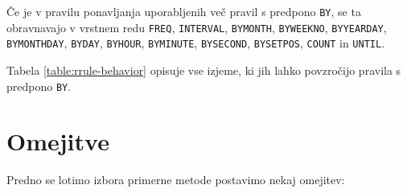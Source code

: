 \begin{table}
\footnotesize
{}
\caption{Razpredelnica izjem pri uporabi pravil za ponavljanje dogodkov. \textbf{Izjema 1:} omeji če je prisotno pravilo \texttt{BYMONTHDAY}, drugače razširi. \textbf{Izjema 2:} omeji za pravili \texttt{BYYEARDAY} in \texttt{BYMONTHDAY}, drugače razširi. }
\label{table:rrule-behavior}
\end{table}

Če je v pravilu ponavljanja uporabljenih več pravil s predpono \texttt{BY}, se ta obravnavajo v vrstnem redu \texttt{FREQ}, \texttt{INTERVAL}, \texttt{BYMONTH}, \texttt{BYWEEKNO}, \texttt{BYYEARDAY}, \texttt{BYMONTHDAY}, \texttt{BYDAY}, \texttt{BYHOUR}, \texttt{BYMINUTE}, \texttt{BYSECOND}, \texttt{BYSETPOS}, \texttt{COUNT} in \texttt{UNTIL}.

Tabela \ref{table:rrule-behavior} opisuje vse izjeme, ki jih lahko povzročijo pravila s predpono \texttt{BY}.

\section{Omejitve}

Predno se lotimo izbora primerne metode postavimo nekaj omejitev:

